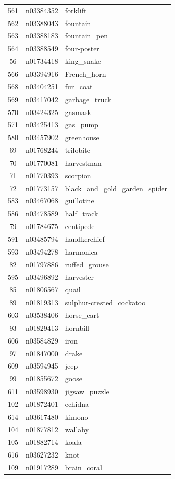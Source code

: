 \begin{table}
\begin{tabular}{cll}
561 & n03384352 & forklift \\
562 & n03388043 & fountain \\
563 & n03388183 & fountain_pen \\
564 & n03388549 & four-poster \\
56 & n01734418 & king_snake \\
566 & n03394916 & French_horn \\
568 & n03404251 & fur_coat \\
569 & n03417042 & garbage_truck \\
570 & n03424325 & gasmask \\
571 & n03425413 & gas_pump \\
580 & n03457902 & greenhouse \\
69 & n01768244 & trilobite \\
70 & n01770081 & harvestman \\
71 & n01770393 & scorpion \\
72 & n01773157 & black_and_gold_garden_spider \\
583 & n03467068 & guillotine \\
586 & n03478589 & half_track \\
79 & n01784675 & centipede \\
591 & n03485794 & handkerchief \\
593 & n03494278 & harmonica \\
82 & n01797886 & ruffed_grouse \\
595 & n03496892 & harvester \\
85 & n01806567 & quail \\
89 & n01819313 & sulphur-crested_cockatoo \\
603 & n03538406 & horse_cart \\
93 & n01829413 & hornbill \\
606 & n03584829 & iron \\
97 & n01847000 & drake \\
609 & n03594945 & jeep \\
99 & n01855672 & goose \\
611 & n03598930 & jigsaw_puzzle \\
102 & n01872401 & echidna \\
614 & n03617480 & kimono \\
104 & n01877812 & wallaby \\
105 & n01882714 & koala \\
616 & n03627232 & knot \\
109 & n01917289 & brain_coral \\

\end{tabular}
\end{table}

